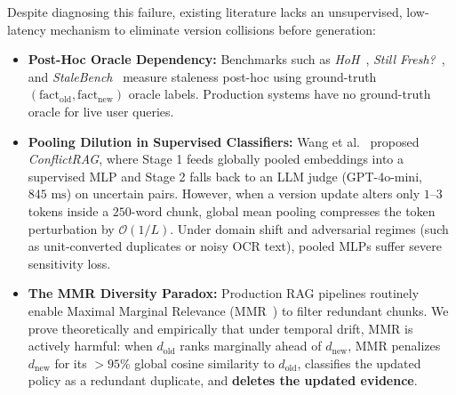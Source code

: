 \documentclass[11pt,a4paper]{article}
\theoremstyle{definition}
\begin{document}
Despite diagnosing this failure, existing literature lacks an unsupervised, low-latency mechanism to eliminate version collisions before generation:
\begin{itemize}
    \item \textbf{Post-Hoc Oracle Dependency:} Benchmarks such as \emph{HoH}~\cite{ouyang2025hoh}, \emph{Still Fresh?}~\cite{stillfresh2026}, and \emph{StaleBench}~\cite{singh2026stalebench} measure staleness post-hoc using ground-truth $(\mathrm{fact}_{\mathrm{old}}, \mathrm{fact}_{\mathrm{new}})$ oracle labels. Production systems have no ground-truth oracle for live user queries.
    \item \textbf{Pooling Dilution in Supervised Classifiers:} Wang et al.~\cite{wang2026conflictrag} proposed \emph{ConflictRAG}, where Stage 1 feeds globally pooled embeddings into a supervised MLP and Stage 2 falls back to an LLM judge (GPT-4o-mini, $845\text{ ms}$) on uncertain pairs. However, when a version update alters only $1$--$3$ tokens inside a $250$-word chunk, global mean pooling compresses the token perturbation by $\mathcal{O}(1/L)$. Under domain shift and adversarial regimes (such as unit-converted duplicates or noisy OCR text), pooled MLPs suffer severe sensitivity loss.
    \item \textbf{The MMR Diversity Paradox:} Production RAG pipelines routinely enable Maximal Marginal Relevance (MMR~\cite{carbonell1998mmr}) to filter redundant chunks. We prove theoretically and empirically that under temporal drift, MMR is actively harmful: when $d_{\mathrm{old}}$ ranks marginally ahead of $d_{\mathrm{new}}$, MMR penalizes $d_{\mathrm{new}}$ for its $>95\%$ global cosine similarity to $d_{\mathrm{old}}$, classifies the updated policy as a redundant duplicate, and \textbf{deletes the updated evidence}.
\end{itemize}
\end{document}
